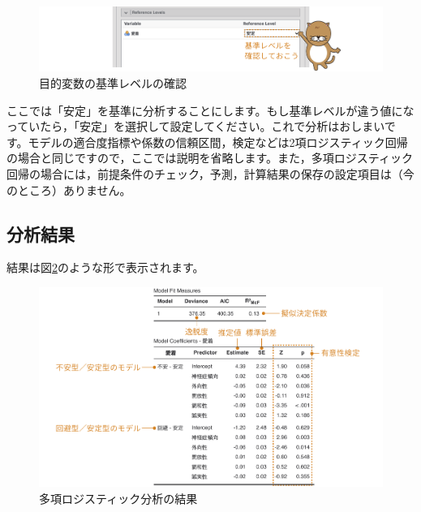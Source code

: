 \documentclass[
  12pt,
  a5jpaper,
  lualatex, ja=standard]{bxjsbook}
\begin{document}
\begin{figure}[!ht]

{\centering \includegraphics[width=1\linewidth]{images/regression/multinomial-reference-levels} 

}

\caption{目的変数の基準レベルの確認}\label{fig:regression-multinomial-reference-levels}
\end{figure}

ここでは「安定」を基準に分析することにします。もし基準レベルが違う値になっていたら，「安定」を選択して設定してください。これで分析はおしまいです。モデルの適合度指標や係数の信頼区間，検定などは2項ロジスティック回帰の場合と同じですので，ここでは説明を省略します。また，多項ロジスティック回帰の場合には，前提条件のチェック，予測，計算結果の保存の設定項目は（今のところ）ありません。

\hypertarget{sub:regression-multinomial-results}{%
\subsection{分析結果}\label{sub:regression-multinomial-results}}

結果は図\ref{fig:regression-multinomial-results}のような形で表示されます。

\begin{figure}[!ht]

{\centering \includegraphics[width=1\linewidth]{images/regression/multinomial-results} 

}

\caption{多項ロジスティック分析の結果}\label{fig:regression-multinomial-results}
\end{figure}
\end{document}
